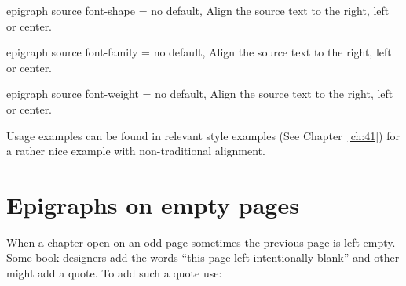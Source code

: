 \begin{docKey}[phd]{ epigraph source font-shape}{ = }{no default, }
Align the source text to the right, left or center.
\end{docKey}

\begin{docKey}[phd]{ epigraph source font-family}{ = }{no default, }
Align the source text to the right, left or center.
\end{docKey}


\begin{docKey}[phd]{epigraph source font-weight}{ = }{no default, }
Align the source text to the right, left or center.
\end{docKey}


Usage examples can be found in relevant style examples (See Chapter~\ref{ch:41}) for a rather 
nice example with non-traditional alignment.

\section{Epigraphs on empty pages}

When a chapter open on an odd page sometimes the  previous page is left empty. Some book designers 
add the words ``this page left intentionally blank'' and other might add a quote. To add such a quote use:


\endinput

